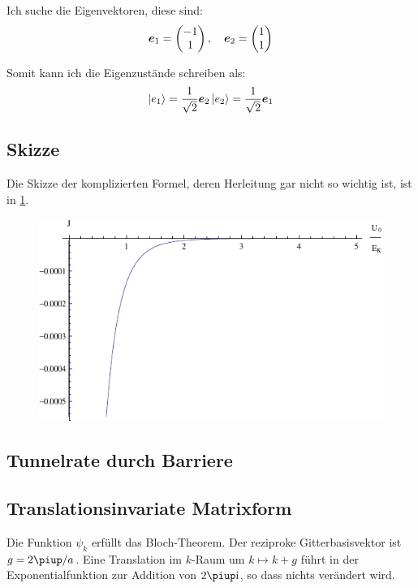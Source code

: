 Ich suche die Eigenvektoren, diese sind:
\[
	\boldsymbol{e}_1 = \begin{pmatrix}
		-1 \\ 1
	\end{pmatrix}
	,\quad
	\boldsymbol{e}_2 = \begin{pmatrix}
		1 \\ 1
	\end{pmatrix}
\]

Somit kann ich die Eigenzustände schreiben als:
\[
	\left| e_1 \right\rangle = \frac{1}{\sqrt{2}} \boldsymbol{e}_2 \\
	\left| e_2 \right\rangle = \frac{1}{\sqrt{2}} \boldsymbol{e}_1 \\
\]

\subsection{Skizze}

Die Skizze der komplizierten Formel, deren Herleitung gar nicht so wichtig ist,
ist in \cref{fig:J}.

\begin{figure}
	\centering
	\includegraphics[width=\linewidth]{3d.pdf}
	\caption{}
	\label{fig:J}
\end{figure}

\subsection{Tunnelrate durch Barriere}

\fehlt

\subsection{Translationsinvariate Matrixform}

Die Funktion $\psi_k$ erfüllt das Bloch-Theorem. Der reziproke
Gitterbasisvektor ist $g = 2\piup/a$. Eine Translation im $k$-Raum um $k
\mapsto k + g$ führt in der Exponentialfunktion zur Addition von $2\piup \ii$,
so dass nichts verändert wird.

